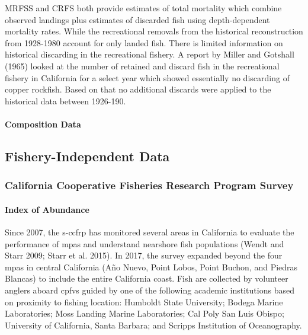 \documentclass[11pt,
  english,
  letterpaper,
]{article}
\begin{document}
MRFSS and CRFS both provide estimates of total mortality which combine observed landings plus estimates of discarded fish using depth-dependent mortality rates. While the recreational removals from the historical reconstruction from 1928-1980 account for only landed fish. There is limited information on historical discarding in the recreational fishery. A report by Miller and Gotshall (1965) looked at the number of retained and discard fish in the recreational fishery in California for a select year which showed essentially no discarding of copper rockfish. Based on that no additional discards were applied to the historical data between 1926-190.

\hypertarget{composition-data-1}{%
\paragraph{Composition Data}\label{composition-data-1}}

\hypertarget{fishery-independent-data}{%
\subsection{Fishery-Independent Data}\label{fishery-independent-data}}

\hypertarget{california-cooperative-fisheries-research-program-survey}{%
\subsubsection{California Cooperative Fisheries Research Program Survey}\label{california-cooperative-fisheries-research-program-survey}}

\hypertarget{index-of-abundance}{%
\paragraph{Index of Abundance}\label{index-of-abundance}}

\hfill\break

Since 2007, the \gls{s-ccfrp} has monitored several areas in California to evaluate the performance of \glspl{mpa} and understand nearshore fish populations (Wendt and Starr 2009; Starr et al. 2015). In 2017, the survey expanded beyond the four \Gls{mpa}s in central California (Año Nuevo, Point Lobos, Point Buchon, and Piedras Blancas) to include the entire California coast. Fish are collected by volunteer anglers aboard \glspl{cpfv} guided by one of the following academic institutions based on proximity to fishing location: Humboldt State University; Bodega Marine Laboratories; Moss Landing Marine Laboratories; Cal Poly San Luis Obispo; University of California, Santa Barbara; and Scripps Institution of Oceanography.
\end{document}
